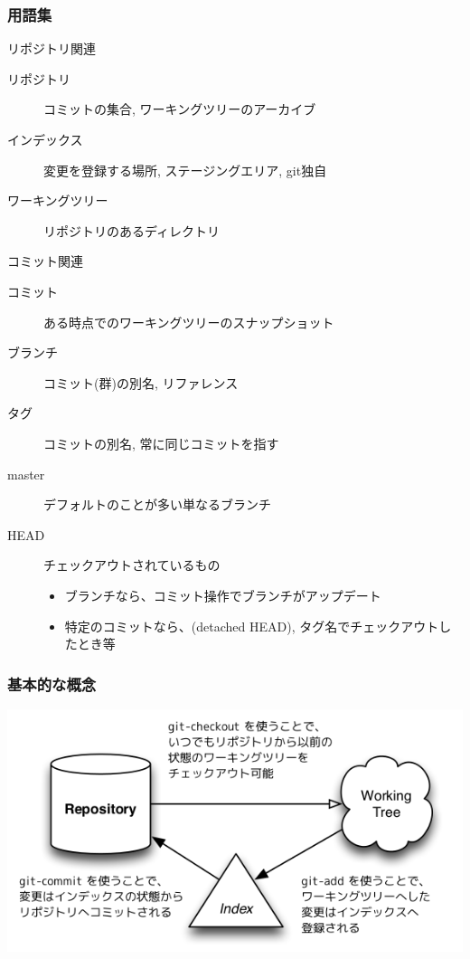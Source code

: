 \begin{frame}
  \frametitle{用語集}
  リポジトリ関連
  \begin{description}
  \item[リポジトリ] コミットの集合, ワーキングツリーのアーカイブ
  \item[インデックス] 変更を登録する場所, ステージングエリア, \alert{git独自}
  \item[ワーキングツリー] リポジトリのあるディレクトリ
  \end{description}
  コミット関連
  \begin{description}
  \item[コミット] ある時点でのワーキングツリーのスナップショット
  \item[ブランチ] \alert{コミット(群)の別名}, リファレンス
  \item[タグ] \alert{コミットの別名}, 常に同じコミットを指す
  \item[master] デフォルトのことが多い\alert{単なるブランチ}
  \item[HEAD] チェックアウトされているもの
    \begin{itemize}
    \item ブランチなら、コミット操作でブランチがアップデート
    \item 特定のコミットなら、(detached HEAD), タグ名でチェックアウトしたとき等
    \end{itemize}
  \end{description}
\end{frame}

\begin{frame}
  \frametitle{基本的な概念}
  \begin{center}
    \includegraphics[height=.6\textheight]{4_ja.png}
  \end{center}
\end{frame}

